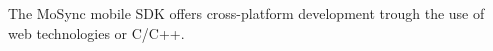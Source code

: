 

The MoSync mobile SDK offers cross-platform development trough the use of web technologies or C/C++.









